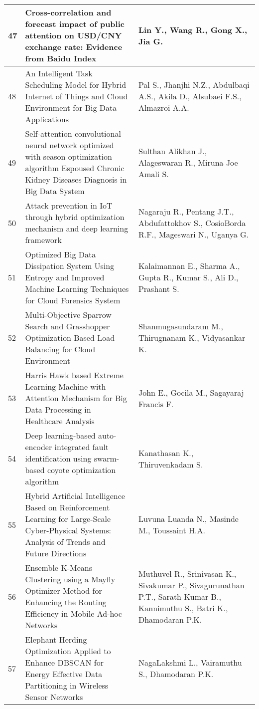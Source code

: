 \begin{landscape}
\begin{longtable}{|p{0.5cm}|p{9cm}|p{7cm}|}
    \hline
    47 & Cross-correlation and forecast impact of public attention on USD/CNY exchange rate: Evidence from Baidu Index & Lin Y., Wang R., Gong X., Jia G. \\
    \hline
    48 & An Intelligent Task Scheduling Model for Hybrid Internet of Things and Cloud Environment for Big Data Applications & Pal S., Jhanjhi N.Z., Abdulbaqi A.S., Akila D., Alsubaei F.S., Almazroi A.A. \\
    \hline
    49 & Self-attention convolutional neural network optimized with season optimization algorithm Espoused Chronic Kidney Diseases Diagnosis in Big Data System & Sulthan Alikhan J., Alageswaran R., Miruna Joe Amali S. \\
    \hline
    50 & Attack prevention in IoT through hybrid optimization mechanism and deep learning framework & Nagaraju R., Pentang J.T., Abdufattokhov S., CosioBorda R.F., Mageswari N., Uganya G. \\
    \hline
    51 & Optimized Big Data Dissipation System Using Entropy and Improved Machine Learning Techniques for Cloud Forensics System & Kalaimannan E., Sharma A., Gupta R., Kumar S., Ali D., Prashant S. \\
    \hline
    52 & Multi-Objective Sparrow Search and Grasshopper Optimization Based Load Balancing for Cloud Environment & Shanmugasundaram M., Thirugnanam K., Vidyasankar K. \\
    \hline
    53 & Harris Hawk based Extreme Learning Machine with Attention Mechanism for Big Data Processing in Healthcare Analysis & John E., Gocila M., Sagayaraj Francis F. \\
    \hline
    54 & Deep learning-based auto-encoder integrated fault identification using swarm-based coyote optimization algorithm & Kanathasan K., Thiruvenkadam S. \\
    \hline
    55 & Hybrid Artificial Intelligence Based on Reinforcement Learning for Large-Scale Cyber-Physical Systems: Analysis of Trends and Future Directions & Luvuna Luanda N., Masinde M., Toussaint H.A. \\
    \hline
    56 & Ensemble K-Means Clustering using a Mayfly Optimizer Method for Enhancing the Routing Efficiency in Mobile Ad-hoc Networks & Muthuvel R., Srinivasan K., Sivakumar P., Sivagurunathan P.T., Sarath Kumar B., Kannimuthu S., Batri K., Dhamodaran P.K. \\
    \hline
    57 & Elephant Herding Optimization Applied to Enhance DBSCAN for Energy Effective Data Partitioning in Wireless Sensor Networks & NagaLakshmi L., Vairamuthu S., Dhamodaran P.K. \\

\end{longtable}
\end{landscape}
